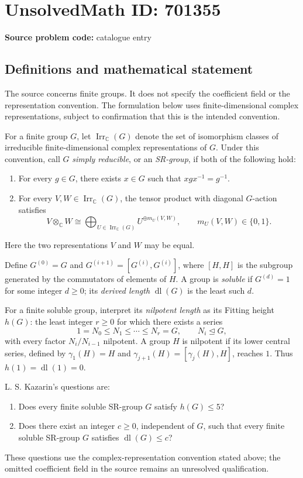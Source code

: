 \documentclass[11pt]{article}
\newcommand{\C}{\mathbb{C}}
\begin{document}
\section*{UnsolvedMath ID: 701355}
\textbf{Source problem code:} catalogue entry
\subsection{Definitions and mathematical statement}
The source concerns finite groups. It does not specify the coefficient field or the representation convention. The formulation below uses finite-dimensional complex representations, subject to confirmation that this is the intended convention.

For a finite group \(G\), let \(\operatorname{Irr}_{\C}(G)\) denote the set of isomorphism classes of irreducible finite-dimensional complex representations of \(G\). Under this convention, call \(G\) \emph{simply reducible}, or an \emph{SR-group}, if both of the following hold:
\begin{enumerate}
\item For every \(g\in G\), there exists \(x\in G\) such that \(xgx^{-1}=g^{-1}\).
\item For every \(V,W\in\operatorname{Irr}_{\C}(G)\), the tensor product with diagonal \(G\)-action satisfies
\[
V\otimes_{\C}W\cong\bigoplus_{U\in\operatorname{Irr}_{\C}(G)}U^{\oplus m_U(V,W)},
\qquad m_U(V,W)\in\{0,1\}.
\]
\end{enumerate}
Here the two representations \(V\) and \(W\) may be equal.

Define \(G^{(0)}=G\) and \(G^{(i+1)}=[G^{(i)},G^{(i)}]\), where \([H,H]\) is the subgroup generated by the commutators of elements of \(H\). A group is \emph{soluble} if \(G^{(d)}=1\) for some integer \(d\geq0\); its \emph{derived length} \(\operatorname{dl}(G)\) is the least such \(d\).

For a finite soluble group, interpret its \emph{nilpotent length} as its Fitting height \(h(G)\): the least integer \(r\geq0\) for which there exists a series
\[
1=N_0\leq N_1\leq\cdots\leq N_r=G,
\qquad N_i\trianglelefteq G,
\]
with every factor \(N_i/N_{i-1}\) nilpotent. A group \(H\) is nilpotent if its lower central series, defined by \(\gamma_1(H)=H\) and \(\gamma_{j+1}(H)=[\gamma_j(H),H]\), reaches \(1\). Thus \(h(1)=\operatorname{dl}(1)=0\).

L. S. Kazarin's questions are:
\begin{enumerate}
\item[(a)] Does every finite soluble SR-group \(G\) satisfy \(h(G)\leq5\)?
\item[(b)] Does there exist an integer \(c\geq0\), independent of \(G\), such that every finite soluble SR-group \(G\) satisfies \(\operatorname{dl}(G)\leq c\)?
\end{enumerate}
These questions use the complex-representation convention stated above; the omitted coefficient field in the source remains an unresolved qualification.
\end{document}
